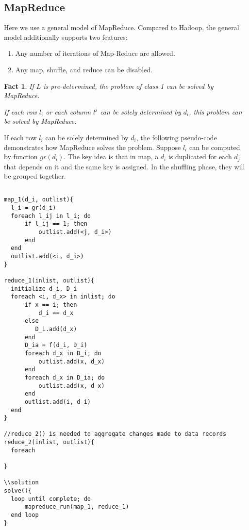 \documentclass[10pt, twocolumn, a4paper]{article}
\newtheorem{fact}{Fact}
\begin{document}
\subsection{MapReduce}

Here we use a general model of MapReduce. Compared to Hadoop, the general model additionally supports two features:

\begin{enumerate}
\item Any number of iterations of Map-Reduce are allowed.
\item Any map, shuffle, and reduce can be disabled.
\end{enumerate}

\begin{fact}

If $L$ is pre-determined, the problem of class 1 can be solved by MapReduce.

If each row $l_i$ or each column $l^j$ can be solely determined by $d_i$, this problem can be solved by MapReduce.

\end{fact}

If each row $l_i$ can be solely determined by $d_i$, the following pseudo-code demonstrates how MapReduce solves the problem. Suppose $l_i$ can be computed by function $gr(d_i)$. The key idea is that in map, a $d_i$ is duplicated for each $d_j$ that depends on it and the same key is assigned. In the shuffling phase, they will be grouped together.
 
\begin{Verbatim}

map_1(d_i, outlist){
  l_i = gr(d_i)
  foreach l_ij in l_i; do
      if l_ij == 1; then
          outlist.add(<j, d_i>)
      end
  end
  outlist.add(<i, d_i>)
}

reduce_1(inlist, outlist){
  initialize d_i, D_i
  foreach <i, d_x> in inlist; do
      if x == i; then
          d_i == d_x
      else
         D_i.add(d_x)
      end
      D_ia = f(d_i, D_i)
      foreach d_x in D_i; do
          outlist.add(x, d_x)
      end
      foreach d_x in D_ia; do
          outlist.add(x, d_x)
      end
      outlist.add(i, d_i)
  end
}

//reduce_2() is needed to aggregate changes made to data records
reduce_2(inlist, outlist){
  foreach
  
}

\\solution
solve(){
  loop until complete; do
      mapreduce_run(map_1, reduce_1)
  end loop
}

\end{Verbatim}
\end{document}
